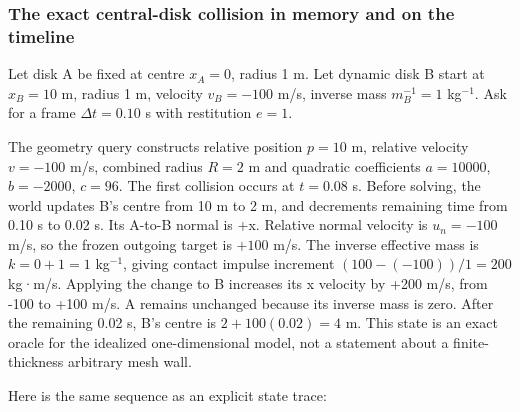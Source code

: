 \subsubsection{The exact central-disk collision in memory and on the timeline}\label{06-engine-ii-ch046-the-exact-central-disk-collision-in-memory-and-on-the-timeline}

Let disk A be fixed at centre \(x_A=0\), radius 1 m. Let dynamic disk B start at \(x_B=10\) m, radius 1 m, velocity \(v_B=-100\) m/s, inverse mass \(m_B^{-1}=1\) kg\(^{-1}\). Ask for a frame \(\Delta t=0.10\) s with restitution \(e=1\).

The geometry query constructs relative position \(p=10\) m, relative velocity \(v=-100\) m/s, combined radius \(R=2\) m and quadratic coefficients \(a=10000\), \(b=-2000\), \(c=96\). The first collision occurs at \(t=0.08\) s. Before solving, the world updates B's centre from 10 m to 2 m, and decrements remaining time from 0.10 s to 0.02 s. Its A-to-B normal is +x. Relative normal velocity is \(u_n=-100\) m/s, so the frozen outgoing target is \(+100\) m/s. The inverse effective mass is \(k=0+1=1\) kg\(^{-1}\), giving contact impulse increment \((100-(-100))/1=200\) kg·m/s. Applying the change to B increases its x velocity by +200 m/s, from -100 to +100 m/s. A remains unchanged because its inverse mass is zero. After the remaining 0.02 s, B's centre is \(2+100(0.02)=4\) m. This state is an exact oracle for the idealized one-dimensional model, not a statement about a finite-thickness arbitrary mesh wall.

Here is the same sequence as an explicit state trace:

